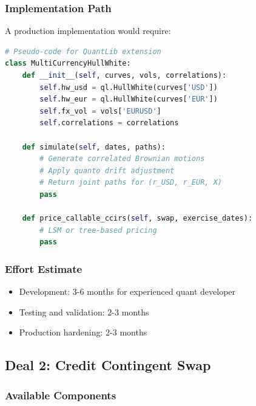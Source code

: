 \documentclass[11pt,a4paper]{article}
\theoremstyle{definition}
\begin{document}
\subsubsection{Implementation Path}

A production implementation would require:

\begin{lstlisting}[language=Python, caption=Conceptual QuantLib Extension]
# Pseudo-code for QuantLib extension
class MultiCurrencyHullWhite:
    def __init__(self, curves, vols, correlations):
        self.hw_usd = ql.HullWhite(curves['USD'])
        self.hw_eur = ql.HullWhite(curves['EUR'])
        self.fx_vol = vols['EURUSD']
        self.correlations = correlations

    def simulate(self, dates, paths):
        # Generate correlated Brownian motions
        # Apply quanto drift adjustment
        # Return joint paths for (r_USD, r_EUR, X)
        pass

    def price_callable_ccirs(self, swap, exercise_dates):
        # LSM or tree-based pricing
        pass
\end{lstlisting}

\subsubsection{Effort Estimate}

\begin{itemize}
    \item Development: 3-6 months for experienced quant developer
    \item Testing and validation: 2-3 months
    \item Production hardening: 2-3 months
\end{itemize}

\subsection{Deal 2: Credit Contingent Swap}

\subsubsection{Available Components}
\end{document}
